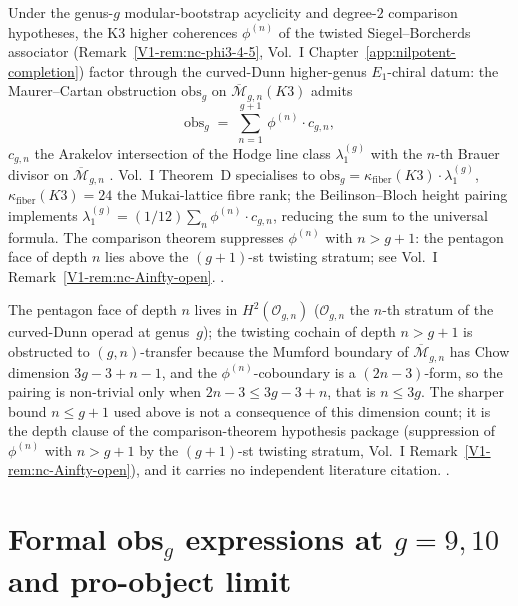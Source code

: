 \begin{remark}
\label{rem:cdhg-obs-g}
Under the genus-$g$ modular-bootstrap acyclicity and degree-$2$
comparison hypotheses, the K3 higher coherences $\phi^{(n)}$ of the
twisted Siegel--Borcherds associator
(Remark~\ref{V1-rem:nc-phi3-4-5}, Vol.~I
Chapter~\ref{app:nilpotent-completion}) factor through the
curved-Dunn higher-genus $E_1$-chiral datum: the Maurer--Cartan
obstruction $\mathrm{obs}_g$ on $\overline{\mathcal M}_{g,n}(K3)$
admits
\[
\mathrm{obs}_g \;=\; \sum_{n=1}^{g+1}\,\phi^{(n)}\cdot c_{g,n},
\]
$c_{g,n}$ the Arakelov intersection of the Hodge line class
$\lambda_1^{(g)}$
with the $n$-th Brauer divisor on
$\overline{\mathcal M}_{g,n}$
\cite{Mumford1983}. Vol.~I Theorem~D specialises to
$\mathrm{obs}_g = \kappa_{\mathrm{fiber}}(K3)\cdot\lambda_1^{(g)}$,
$\kappa_{\mathrm{fiber}}(K3) = 24$ the Mukai-lattice fibre rank;
the Beilinson--Bloch height pairing implements
$\lambda_1^{(g)} = (1/12)\sum_{n}\phi^{(n)}\cdot c_{g,n}$, reducing the
sum to the universal formula. The comparison theorem suppresses
$\phi^{(n)}$ with $n > g+1$: the pentagon face of depth $n$
lies above the $(g+1)$-st twisting stratum; see Vol.~I
Remark~\ref{V1-rem:nc-Ainfty-open}.
\cite{Mumford1983,BeilinsonBloch2005,GritsenkoNikulin1998}.
\end{remark}

\begin{remark}
\label{rem:cdhg-tower-bound}
The pentagon face of depth $n$ lives in $H^2(\mathcal{O}_{g,n})$
($\mathcal{O}_{g,n}$ the $n$-th stratum of the curved-Dunn operad
at genus~$g$); the twisting cochain of depth $n > g+1$ is
obstructed to $(g,n)$-transfer because the Mumford boundary of
$\overline{\mathcal M}_{g,n}$ has Chow dimension $3g - 3 + n - 1$,
and the $\phi^{(n)}$-coboundary is a $(2n-3)$-form, so the
pairing is non-trivial only when $2n - 3 \le 3g - 3 + n$, that
is $n \le 3g$. The sharper bound $n \le g+1$ used above is not a
consequence of this dimension count; it is the depth clause of the
comparison-theorem hypothesis package (suppression of
$\phi^{(n)}$ with $n > g+1$ by the $(g+1)$-st twisting stratum,
Vol.~I Remark~\ref{V1-rem:nc-Ainfty-open}), and it carries no
independent literature citation.
\cite{Mumford1983,BeilinsonBloch2005}.
\end{remark}

\section{Formal obs$_g$ expressions at $g = 9, 10$ and pro-object limit}
\label{sec:cdhg-supplement-iii}

